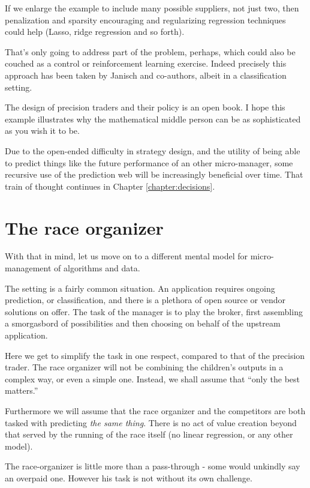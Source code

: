 If we enlarge the example to include many possible suppliers, not just two, then penalization and sparsity encouraging and regularizing regression techniques could help (Lasso, ridge regression and so forth). 

That's only going to address part of the problem, perhaps, which could also be couched as a control or reinforcement learning exercise. Indeed precisely this approach has been taken by Janisch and co-authors, albeit in a classification setting. 


The design of precision traders and their policy is an open book. I hope this example illustrates why the mathematical middle person can be as sophisticated as you wish it to be. 

Due to the open-ended difficulty in strategy design, and the utility of being able to predict things like the future performance of an other micro-manager, some recursive use of the prediction web will be increasingly beneficial over time. That train of thought continues in Chapter \ref{chapter:decisions}.




\section{The race organizer}

With that in mind, let us move on to a different mental model for micro-management of algorithms and data. 

The setting is a fairly common situation. An application requires ongoing prediction, or classification, and there is a plethora of open source or vendor solutions on offer. The task of the manager is to play the broker, first assembling a smorgasbord of possibilities and then choosing on behalf of the upstream application.  

Here we get to simplify the task in one respect, compared to that of the precision trader. The race organizer will not be combining the children's outputs in a complex way, or even a simple one. Instead, we shall assume that ``only the best matters.'' 

Furthermore we will assume that the race organizer and the competitors are both tasked with predicting {\em the same thing}. There is no act of value creation beyond that served by the running of the race itself (no linear regression, or any other model).  

The race-organizer is little more than a pass-through - some would unkindly say an overpaid one. However his task is not without its own challenge.  

